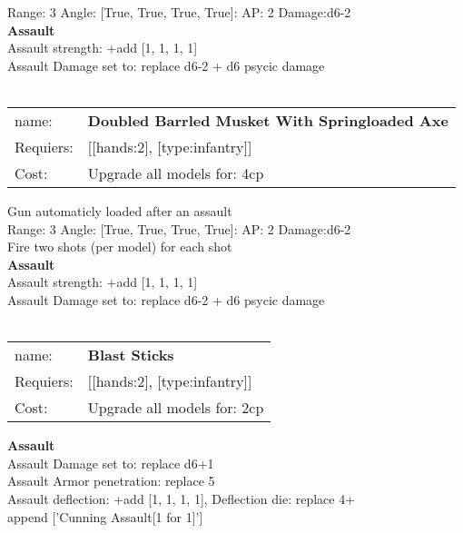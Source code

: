 Range: 3  Angle: [True, True, True, True]: AP: 2 Damage:d6-2 \\



{\bf Assault} \ \\
Assault strength: +add [1, 1, 1, 1] 
\\ 
Assault Damage set to: replace d6-2 + d6 psycic damage
\\ 




\ \\
\begin{tabular}{ll}
name: & {\bf Doubled Barrled Musket With Springloaded Axe } \\
Requiers: & [[hands:2], [type:infantry]] \\
Cost: & Upgrade all models for: 4cp \\
\end{tabular}

Gun automaticly loaded after an assault\\ 


Range: 3  Angle: [True, True, True, True]: AP: 2 Damage:d6-2 \\
Fire two shots (per model) for each shot\\ 



{\bf Assault} \ \\
Assault strength: +add [1, 1, 1, 1] 
\\ 
Assault Damage set to: replace d6-2 + d6 psycic damage
\\ 




\ \\
\begin{tabular}{ll}
name: & {\bf Blast Sticks } \\
Requiers: & [[hands:2], [type:infantry]] \\
Cost: & Upgrade all models for: 2cp \\
\end{tabular}





{\bf Assault} \ \\
Assault Damage set to: replace d6+1
\\ 
Assault Armor penetration: replace 5 
\\ 
Assault deflection: +add [1, 1, 1, 1], Deflection die: replace 4+
\\ 

append ['Cunning Assault[1 for 1]']


